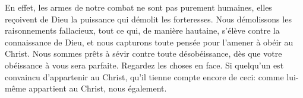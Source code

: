 En effet, les armes de notre combat ne sont pas purement humaines,
	elles reçoivent de Dieu la puissance qui démolit les forteresses.
Nous démolissons les raisonnements fallacieux,
	tout ce qui, de manière hautaine, s’élève contre la connaissance de Dieu,
	et nous capturons toute pensée pour l’amener à obéir au Christ.
Nous sommes prêts à sévir contre toute désobéissance,
	dès que votre obéissance à vous sera parfaite.
Regardez les choses en face.
Si quelqu’un est convaincu d’appartenir au Christ,
	qu’il tienne compte encore de ceci:
	comme lui-même appartient au Christ, nous également.
